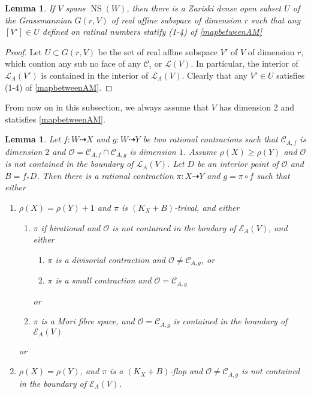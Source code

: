 \documentclass{article}
\newtheorem{lem}[defn]{Lemma}
\begin{document}
\begin{lem}\label{subspace}
  \cite[Corollary 3.4]{haconSarkisovProgram2011}If $V$ spans  $\operatorname{NS}(W)$, then there is a Zariski dense open subset $U$ of the Grassmannian $G(r,V)$ of real affine subspace of dimension $r$ such that any  $[V']\in U$ defined on ratinal numbers statify (1-4) of \ref{mapbetweenAM} 
\end{lem}
\begin{proof}
 Let $U \subset G(r,V) $ be the set of real affine subspace  $V'$ of $V$ of dimension $r$, which contion any sub no face of any $\mathcal{C}_{i}$ or $\mathcal{L}(V)$. In particular, the interior of  $\mathcal{L}_{A}(V')$ is contained in the interior of $\mathcal{L}_{A}(V)$. Clearly that any $V'\in U$ satisfies (1-4) of \ref{mapbetweenAM}. \end{proof}
From now on in this subsection, we always assume that $V$ has dimension $2$ and statisfies \ref{mapbetweenAM}.  
\begin{lem}
\cite[Lemma 3.5]{haconSarkisovProgram2011} Let $ f:W\dashrightarrow X $ and $ g:W\dashrightarrow  Y $ be two rational contracions such that $ \mathcal{C}_{A,f} $ is dimension $ 2 $ and $ \mathcal{O}=\mathcal{C}_{A,f}\cap \mathcal{C}_{A,g} $ is dimension $ 1 $. Assume $ \rho(X)\geqslant \rho(Y) $ and $ \mathcal{O} $ is not contained in the boundary of $ \mathcal{L}_{A}(V) $. Let $ D $ be an interior point of $ \mathcal{O} $ and $ B=f_*D $. Then there is a rational contraction $ \pi:X\dashrightarrow Y $ and $ g=\pi\circ f $ such that either
\begin{enumerate}
  \item $ \rho(X)=\rho(Y)+1 $ and $ \pi  $ is $ (K_X+B) $-trival, and either
  \begin{enumerate}
    \item $ \pi $ if birational and $ \mathcal{O} $ is not contained in the boudary of $ \mathcal{E}_A(V) $, and either
    \begin{enumerate}
      \item $ \pi $ is a divisorial contraction and $ \mathcal{O}\neq \mathcal{C}_{A,g} $, or
      \item $ \pi $ is a small contraction and $ \mathcal{O}= \mathcal{C}_{A,g} $
    \end{enumerate}
    or
    \item $ \pi $ is a Mori fibre space, and $ \mathcal{O}=\mathcal{C}_{A,g} $ is contained in the boundary of $ \mathcal{E}_{A}(V) $
  \end{enumerate}
or
  \item $ \rho(X)=\rho(Y) $, and $ \pi $ is  a $ (K_X+B) $-flop and $ \mathcal{O}\neq\mathcal{C}_{A,g} $ is not contained in the boundary of $ \mathcal{E}_A(V) $.
  \end{enumerate}
\end{lem}
\end{document}
